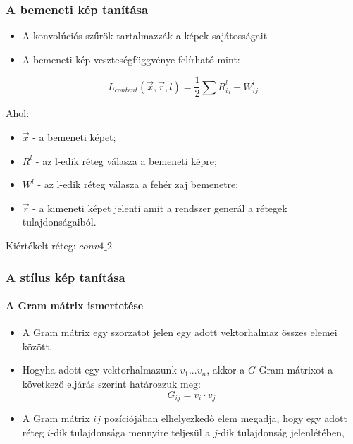 \documentclass{beamer}
\begin{document}
	\begin{frame}
		\frametitle{A bemeneti kép tanítása}
		\begin{itemize}
			\item A konvolúciós szűrök tartalmazzák a képek sajátosságait
			\item A bemeneti kép veszteségfüggvénye felírható mint:
		\end{itemize}
			
		\begin{equation}
			L_{content}(\vec{x}, \vec{r}, l) = \frac{1}{2}\sum{R^l_{ij} - W^l_{ij}}
		\end{equation}
		
		Ahol:
		\begin{itemize}
			\item \(\vec{x}\) - a bemeneti képet;
			\item \(R^l\) - az l-edik réteg válasza a bemeneti képre;
			\item \(W^l\) - az l-edik réteg válasza a fehér zaj bemenetre;
			\item \(\vec{r}\) - a kimeneti képet jelenti amit a rendszer generál a rétegek tulajdonságaiból.
		\end{itemize}
		
		Kiértékelt réteg: \(conv4\_2\)
	
	\end{frame}

	\begin{frame}
		\frametitle{A stílus kép tanítása}
		\framesubtitle{A Gram mátrix ismertetése}
		
		\begin{itemize}
			\item A Gram mátrix egy szorzatot jelen egy adott vektorhalmaz összes elemei között.
			\item Hogyha adott egy vektorhalmazunk \(v_1...v_n\), akkor a \(G\) Gram mátrixot a következő eljárás szerint határozzuk meg:
				\begin{equation}
					G_{ij} = v_i \cdot v_j
				\end{equation}
			\item A Gram mátrix \(ij\) pozíciójában elhelyezkedő elem megadja, hogy egy adott réteg \(i\)-dik tulajdonsága mennyire teljesül a \(j\)-dik tulajdonság jelenlétében,
		\end{itemize}
	\end{frame}
\end{document}
